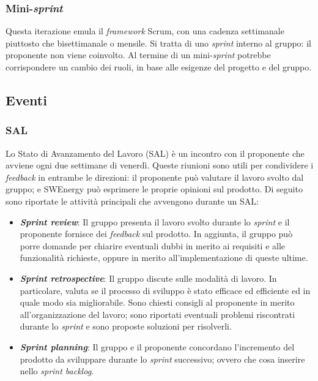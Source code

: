 \subsubsection{Mini-\textit{sprint}}
Questa iterazione emula il \textit{framework} Scrum, con una cadenza settimanale
piuttosto che bisettimanale o mensile. Si tratta di uno \textit{sprint}
interno al gruppo: il proponente non viene coinvolto. Al termine di un
mini-\textit{sprint} potrebbe corrispondere un cambio dei ruoli, in base alle
esigenze del progetto e del gruppo.

\subsection{Eventi}

\subsubsection{SAL}
Lo Stato di Avanzamento del Lavoro (SAL) è un incontro con il proponente che
avviene ogni due settimane di venerdì. Queste riunioni sono utili per
condividere i \textit{feedback} in entrambe le direzioni: il proponente può
valutare il lavoro svolto dal gruppo; e SWEnergy può esprimere le proprie
opinioni sul prodotto. Di seguito sono riportate le attività principali che
avvengono durante un SAL:

\begin{itemize}
	\item \textbf{\textit{Sprint review}}: Il gruppo presenta il lavoro svolto
	      durante lo
	      \textit{sprint} e il proponente fornisce dei \textit{feedback} sul
	      prodotto. In aggiunta, il gruppo può porre domande per chiarire
	      eventuali dubbi in merito ai requisiti e alle funzionalità richieste,
	      oppure in merito all'implementazione di queste ultime.

	\item \textbf{\textit{Sprint retrospective}}: Il gruppo discute sulle modalità
	      di lavoro. In particolare, valuta se il processo di sviluppo
	      è stato efficace ed efficiente ed in quale modo sia migliorabile.
	      Sono chiesti consigli al proponente in merito all'organizzazione del
	      lavoro; sono riportati eventuali problemi riscontrati durante lo
	      \textit{sprint} e sono proposte soluzioni per risolverli.

	\item \textbf{\textit{Sprint planning}}: Il gruppo e il proponente concordano
	      l'incremento del prodotto da sviluppare durante lo \textit{sprint}
	      successivo; ovvero che cosa inserire nello \textit{sprint backlog}.
\end{itemize}

